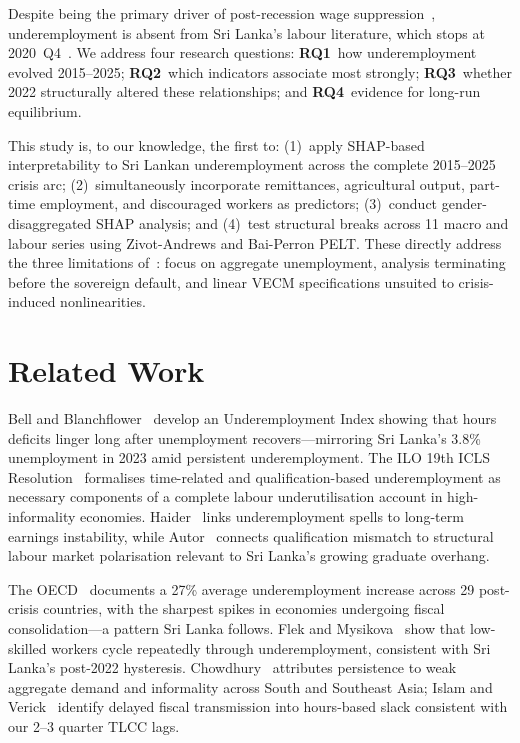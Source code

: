 \documentclass[conference]{IEEEtran}
\begin{document}
Despite being the primary driver of post-recession wage
suppression~\cite{bell2018underemployment}, underemployment is absent
from Sri Lanka's labour literature, which stops at 2020~Q4~\cite{pabasara2025impact}.
We address four research questions: \textbf{RQ1}~how underemployment
evolved 2015--2025; \textbf{RQ2}~which indicators associate most strongly;
\textbf{RQ3}~whether 2022 structurally altered these relationships; and
\textbf{RQ4}~evidence for long-run equilibrium.

This study is, to our knowledge, the first to: (1)~apply SHAP-based
interpretability to Sri Lankan underemployment across the complete
2015--2025 crisis arc; (2)~simultaneously incorporate remittances,
agricultural output, part-time employment, and discouraged workers as
predictors; (3)~conduct gender-disaggregated SHAP analysis; and
(4)~test structural breaks across 11 macro and labour series using
Zivot-Andrews and Bai-Perron PELT. These directly address the three
limitations of~\cite{pabasara2025impact}: focus on
aggregate unemployment, analysis terminating before the sovereign
default, and linear VECM specifications unsuited to crisis-induced
nonlinearities.

\section{Related Work}

Bell and Blanchflower~\cite{bell2018underemployment} develop an
Underemployment Index showing that hours deficits linger long after
unemployment recovers---mirroring Sri Lanka's 3.8\% unemployment in 2023
amid persistent underemployment. The ILO 19th ICLS Resolution~\cite{ilo2013}
formalises time-related and qualification-based underemployment as
necessary components of a complete labour underutilisation account in
high-informality economies. Haider~\cite{haider2001} links underemployment
spells to long-term earnings instability, while Autor~\cite{autor2014}
connects qualification mismatch to structural labour market
polarisation relevant to Sri Lanka's growing graduate overhang.

The OECD~\cite{oecd2017} documents a 27\% average underemployment increase
across 29 post-crisis countries, with the sharpest spikes in economies
undergoing fiscal consolidation---a pattern Sri Lanka follows. Flek and
Mysikova~\cite{flek2015} show that low-skilled workers cycle repeatedly
through underemployment, consistent with Sri Lanka's post-2022 hysteresis.
Chowdhury~\cite{chowdhury2009} attributes persistence to weak aggregate
demand and informality across South and Southeast Asia; Islam and
Verick~\cite{islam2011} identify delayed fiscal transmission into hours-based
slack consistent with our 2--3 quarter TLCC lags.
\end{document}
